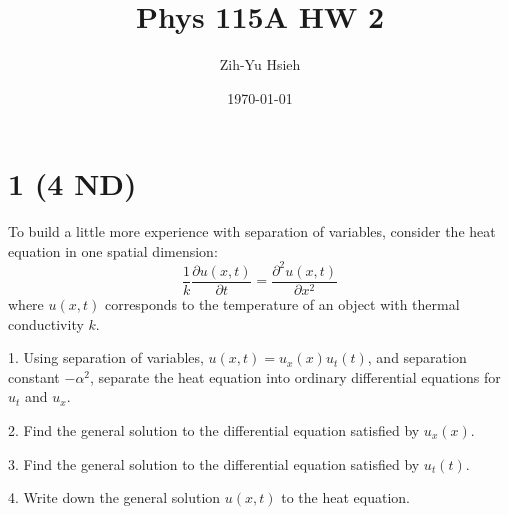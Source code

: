 \documentclass{article}
\title{Phys 115A HW 2}
\author{Zih-Yu Hsieh}
\date{\today}
\begin{document}
\maketitle

\section*{1 (4 ND)}
\begin{ques}\label{q1}
To build a little more experience with separation of variables, consider the heat equation
in one spatial dimension:
\[
\frac{1}{k}\frac{\partial u(x, t)}{\partial t} = \frac{\partial^2 u(x, t)}{\partial x^2}
\]
where $u(x, t)$ corresponds to the temperature of an object with thermal conductivity $k$.

1. Using separation of variables, $u(x, t) = u_x(x)u_t(t)$, and separation constant $-\alpha^2$, separate the heat equation into ordinary differential equations for $u_t$ and $u_x$.

2. Find the general solution to the differential equation satisfied by $u_x(x)$.

3. Find the general solution to the differential equation satisfied by $u_t(t)$.

4. Write down the general solution $u(x, t)$ to the heat equation.
\end{ques}
\end{document}
